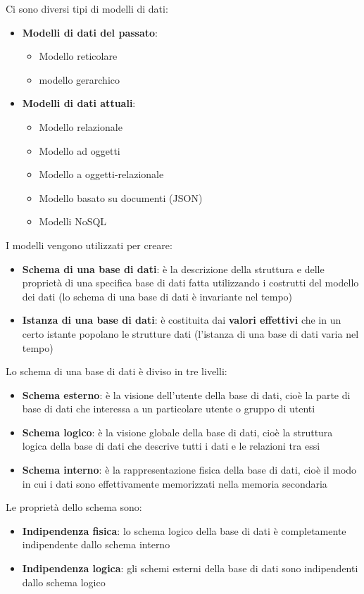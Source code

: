 \documentclass[a4paper]{article}
\begin{document}
Ci sono diversi tipi di modelli di dati:
\begin{itemize}
  \item \textbf{Modelli di dati del passato}:
    \begin{itemize}
      \item Modello reticolare
      \item modello gerarchico
    \end{itemize}

  \item \textbf{Modelli di dati attuali}:
    \begin{itemize}
      \item Modello relazionale
      \item Modello ad oggetti
      \item Modello a oggetti-relazionale
      \item Modello basato su documenti (JSON)
      \item Modelli NoSQL
    \end{itemize}
\end{itemize}

I modelli vengono utilizzati per creare:
\begin{itemize}
  \item \textbf{Schema di una base di dati}: è la descrizione della struttura e delle
    proprietà di una specifica base di dati fatta utilizzando i costrutti del modello dei
    dati (lo schema di una base di dati è invariante nel tempo)
  \item \textbf{Istanza di una base di dati}: è costituita dai \textbf{valori effettivi}
    che in un certo istante popolano le strutture dati (l'istanza di una base di dati
    varia nel tempo)
\end{itemize}

Lo schema di una base di dati è diviso in tre livelli:
\begin{itemize}
  \item \textbf{Schema esterno}: è la visione dell'utente della base di dati, cioè la
    parte di base di dati che interessa a un particolare utente o gruppo di utenti
  \item \textbf{Schema logico}: è la visione globale della base di dati, cioè la
    struttura logica della base di dati che descrive tutti i dati e le relazioni tra
    essi
  \item \textbf{Schema interno}: è la rappresentazione fisica della base di dati, cioè
    il modo in cui i dati sono effettivamente memorizzati nella memoria secondaria
\end{itemize}
Le proprietà dello schema sono:
\begin{itemize}
  \item \textbf{Indipendenza fisica}: lo schema logico della base di dati è completamente
    indipendente dallo schema interno
  \item \textbf{Indipendenza logica}: gli schemi esterni della base di dati sono
    indipendenti dallo schema logico
\end{itemize}
\end{document}
